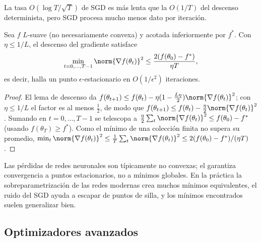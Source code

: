 La tasa $O(\log T/\sqrt{T})$ de SGD es m\'as lenta que la $O(1/T)$ del descenso
determinista, pero SGD procesa mucho menos dato por iteraci\'on.

\begin{theorem}
\label{thm:found:gd-nonconvex}
Sea $f$ $L$-suave (no necesariamente convexa) y acotada inferiormente por $f^*$.
Con $\eta \le 1/L$, el descenso del gradiente satisface
\[
  \min_{t=0,\ldots,T-1} \norm{\nabla f(\theta_t)}^2 \le
  \frac{2(f(\theta_0) - f^*)}{\eta T},
\]
es decir, halla un punto $\epsilon$-estacionario en $O(1/\epsilon^2)$ iteraciones.
\end{theorem}

\begin{proof}
El lema de descenso da $f(\theta_{t+1}) \le f(\theta_t) - \eta(1 -
\frac{L\eta}{2})\norm{\nabla f(\theta_t)}^2$; con $\eta \le 1/L$ el factor es al
menos $\frac12$, de modo que $f(\theta_{t+1}) \le f(\theta_t) -
\frac{\eta}{2}\norm{\nabla f(\theta_t)}^2$. Sumando en $t = 0, \ldots, T-1$ se
telescopa a $\frac{\eta}{2}\sum_t \norm{\nabla f(\theta_t)}^2 \le f(\theta_0) -
f^*$ (usando $f(\theta_T) \ge f^*$). Como el m\'inimo de una colecci\'on finita no
supera su promedio, $\min_t \norm{\nabla f(\theta_t)}^2 \le \frac{1}{T}\sum_t
\norm{\nabla f(\theta_t)}^2 \le 2(f(\theta_0) - f^*)/(\eta T)$.
\end{proof}

Las p\'erdidas de redes neuronales son t\'ipicamente no convexas; el
 garantiza convergencia a puntos estacionarios, no a
m\'inimos globales. En la pr\'actica la sobreparametrizaci\'on de las redes modernas
crea muchos m\'inimos equivalentes, el ruido del SGD ayuda a escapar de puntos de
silla, y los m\'inimos encontrados suelen generalizar bien.

\subsection{Optimizadores avanzados}
\label{sec:found:optimizers}


